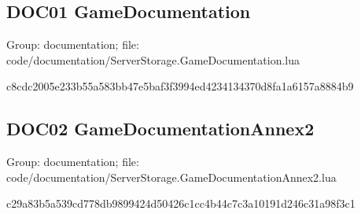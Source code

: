 \subsection{DOC01 GameDocumentation}
Group: documentation; file: code/\allowbreak{}documentation/\allowbreak{}ServerStorage.\allowbreak{}GameDocumentation.\allowbreak{}lua

\begin{flushleft}\ttfamily\footnotesize c8cdc2005e233b55a583bb47e5baf3f3994ed4234134370d8fa1a6157a8884b9\end{flushleft}
\subsection{DOC02 GameDocumentationAnnex2}
Group: documentation; file: code/\allowbreak{}documentation/\allowbreak{}ServerStorage.\allowbreak{}GameDocumentationAnnex2.\allowbreak{}lua

\begin{flushleft}\ttfamily\footnotesize c29a83b5a539cd778db9899424d50426c1cc4b44c7c3a10191d246c31a98f3c1\end{flushleft}
